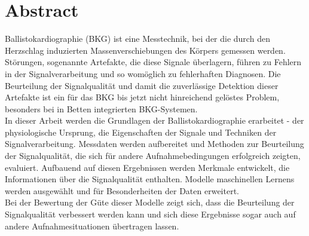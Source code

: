 \clearpage
\chapter*{Abstract}\label{abstract}


Ballistokardiographie (BKG) ist eine Messtechnik, bei der die durch den Herzschlag induzierten Massenverschiebungen des Körpers gemessen werden. Störungen, sogenannte Artefakte, die diese Signale überlagern, führen zu Fehlern in der Signalverarbeitung und so womöglich zu fehlerhaften Diagnosen. Die Beurteilung der Signalqualität und damit die zuverlässige Detektion dieser Artefakte ist ein für das BKG bis jetzt nicht hinreichend gelöstes Problem, besonders bei in Betten integrierten BKG-Systemen.\\ 
In dieser Arbeit werden die Grundlagen der Ballistokardiographie erarbeitet - der physiologische Ursprung, die Eigenschaften der Signale und Techniken der Signalverarbeitung. Messdaten werden aufbereitet und Methoden zur Beurteilung der Signalqualität, die sich für andere Aufnahmebedingungen erfolgreich zeigten, evaluiert. Aufbauend auf diesen Ergebnissen werden Merkmale entwickelt, die Informationen über die Signalqualität enthalten. Modelle maschinellen Lernens werden ausgewählt und für Besonderheiten der Daten erweitert.\\
Bei der Bewertung der Güte dieser Modelle zeigt sich, dass die Beurteilung der Signalqualität verbessert werden kann und sich diese Ergebnisse sogar auch auf andere Aufnahmesituationen übertragen lassen.

